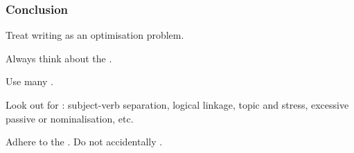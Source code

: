 \begin{frame}
  \frametitle{Conclusion}

   Treat writing as an optimisation problem.

  \medskip
  \pause

  Always think about the .

  \medskip
  \pause

  Use many .

  \medskip
  \pause

  Look out for : subject-verb separation, logical linkage, topic and stress, excessive passive or nominalisation, etc.

  \medskip
  \pause

  Adhere to the . Do not accidentally .
\end{frame}


